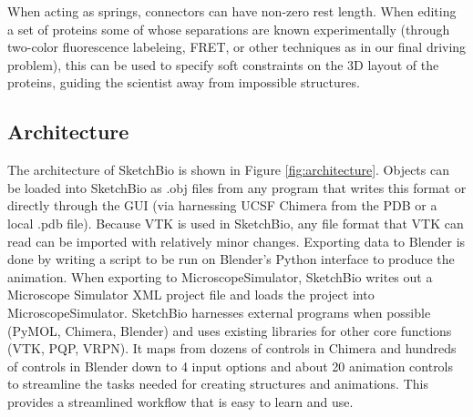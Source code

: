 \documentclass[twocolumn]{bmcart}%
\begin{document}
When acting as springs, connectors can have non-zero rest length.
When editing a set of proteins some of whose separations are known experimentally (through two-color fluorescence labeleing, FRET, or other techniques as in our final driving problem), this can be used to specify soft constraints on the 3D layout of the proteins, guiding the scientist away from impossible structures.

\subsection*{Architecture}

The architecture of SketchBio is shown in Figure \ref{fig:architecture}.
Objects can be loaded into SketchBio as .obj files from any program that writes this format or directly through the GUI (via harnessing UCSF Chimera from the PDB or a local .pdb file).
Because VTK is used in SketchBio, any file format that VTK can read can be imported with relatively minor changes.
Exporting data to Blender is done by writing a script to be run on Blender's Python interface to produce the animation.
When exporting to MicroscopeSimulator, SketchBio writes out a Microscope Simulator XML project file and loads the project into MicroscopeSimulator.
SketchBio harnesses external programs when possible (PyMOL, Chimera, Blender) and uses existing libraries for other core functions (VTK, PQP, VRPN).
It maps from dozens of controls in Chimera and hundreds of controls in Blender down to 4 input options and about 20 animation controls to streamline the tasks needed for creating structures and animations.
This provides a streamlined workflow that is easy to learn and use.
\end{document}
